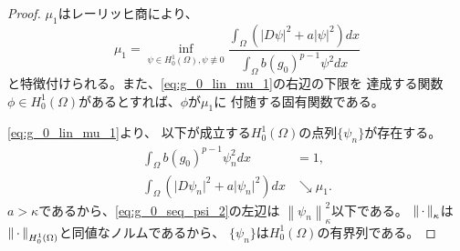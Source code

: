 \begin{proof}
 $\mu_1$はレーリッヒ商により、
 \begin{equation}
  \mu_1 = \inf_{\psi \in H_0^1(\Omega), \psi \not\equiv 0}
   \frac{\displaystyle \int_\Omega 
   \left( \lvert D \psi \rvert^2 + a
    \lvert \psi \rvert^2
   \right) dx}{\displaystyle \int_\Omega b (g_0)^{p-1} \psi^2 dx}
   \label{eq:g_0_lin_mu_1}
 \end{equation}
 と特徴付けられる。また、\eqref{eq:g_0_lin_mu_1}の右辺の下限を
 達成する関数$\phi \in H_0^1(\Omega)$があるとすれば、$\phi$が$\mu_1$に
 付随する固有関数である。

 \eqref{eq:g_0_lin_mu_1}より、
 以下が成立する$H_0^1(\Omega)$の点列$\{ \psi_n \}$が存在する。
 \begin{align}
  \int_\Omega b(g_0)^{p-1} \psi_n^2 dx &= 1, \label{eq:g_0_seq_psi_1} \\
  \int_\Omega \left( \lvert D\psi_n \rvert^2 
  + a \lvert \psi_n \rvert^2 \right) dx
  & \searrow \mu_1. \label{eq:g_0_seq_psi_2}
 \end{align}
 $a > \kappa$であるから、\eqref{eq:g_0_seq_psi_2}の左辺は
 $\left\| \psi_n \right\|_\kappa^2$以下である。
 $\left\|\, \cdot \, \right\|_\kappa$は
 $\left\|\, \cdot \, \right\|_{H_0^1(\Omega)}$と同値なノルムであるから、
 $\{ \psi_n \}$は$H_0^1(\Omega)$の有界列である。
 

\end{proof}
